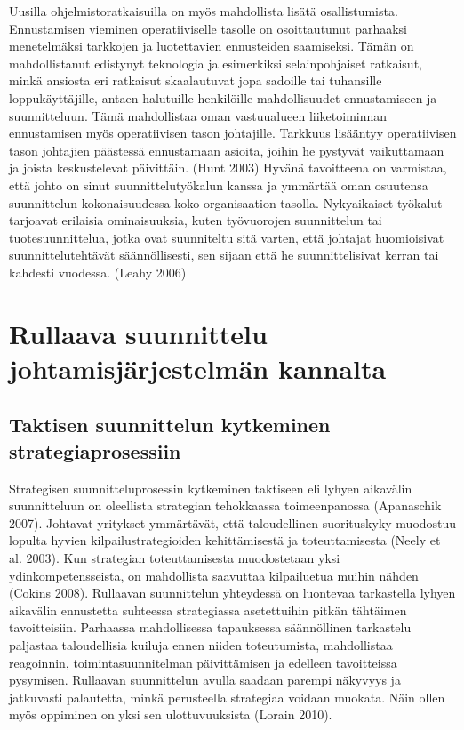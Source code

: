 \documentclass[12pt,a4paper,oneside,pdftex]{report}
\begin{document}
Uusilla ohjelmistoratkaisuilla on myös mahdollista lisätä osallistumista. Ennustamisen vieminen operatiiviselle tasolle on osoittautunut parhaaksi menetelmäksi tarkkojen ja luotettavien ennusteiden saamiseksi. Tämän on mahdollistanut edistynyt teknologia ja esimerkiksi selainpohjaiset ratkaisut, minkä ansiosta eri ratkaisut skaalautuvat jopa sadoille tai tuhansille loppukäyttäjille, antaen halutuille henkilöille mahdollisuudet ennustamiseen ja suunnitteluun. Tämä mahdollistaa oman vastuualueen liiketoiminnan ennustamisen myös operatiivisen tason johtajille. Tarkkuus lisääntyy operatiivisen tason johtajien päästessä ennustamaan asioita, joihin he pystyvät vaikuttamaan ja joista keskustelevat päivittäin. (Hunt 2003) Hyvänä tavoitteena on varmistaa, että johto on sinut suunnittelutyökalun kanssa ja ymmärtää oman osuutensa suunnittelun kokonaisuudessa koko organisaation tasolla. Nykyaikaiset työkalut tarjoavat erilaisia ominaisuuksia, kuten työvuorojen suunnittelun tai tuotesuunnittelua, jotka ovat suunniteltu sitä varten, että johtajat huomioisivat suunnittelutehtävät säännöllisesti, sen sijaan että he suunnittelisivat kerran tai kahdesti vuodessa. (Leahy 2006)

\section{Rullaava suunnittelu johtamisjärjestelmän kannalta}

\subsection{Taktisen suunnittelun kytkeminen strategiaprosessiin}

Strategisen suunnitteluprosessin kytkeminen taktiseen eli lyhyen aikavälin suunnitteluun on oleellista strategian tehokkaassa toimeenpanossa (Apanaschik 2007). Johtavat yritykset ymmärtävät, että taloudellinen suorituskyky muodostuu lopulta hyvien kilpailustrategioiden kehittämisestä ja toteuttamisesta (Neely et al. 2003). Kun strategian toteuttamisesta muodostetaan yksi ydinkompetensseista, on mahdollista saavuttaa kilpailuetua muihin nähden (Cokins 2008). Rullaavan suunnittelun yhteydessä on luontevaa tarkastella lyhyen aikavälin ennustetta suhteessa strategiassa asetettuihin pitkän tähtäimen tavoitteisiin. Parhaassa mahdollisessa tapauksessa säännöllinen tarkastelu paljastaa taloudellisia kuiluja ennen niiden toteutumista, mahdollistaa reagoinnin, toimintasuunnitelman päivittämisen ja edelleen tavoitteissa pysymisen. Rullaavan suunnittelun avulla saadaan parempi näkyvyys ja jatkuvasti palautetta, minkä perusteella strategiaa voidaan muokata. Näin ollen myös oppiminen on yksi sen ulottuvuuksista (Lorain 2010).
\end{document}
